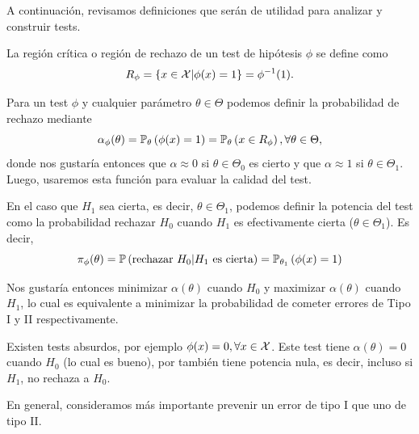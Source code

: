 A continuación, revisamos definiciones que serán de utilidad para analizar y construir tests. 

\begin{definition}
	La región crítica o región de rechazo de un test de hipótesis $\phi$ se define como 
	\begin{equation}
		R_\phi = \{x\in{\mathcal X} | \phi(x)=1\} = \phi^{-1}(1).
	\end{equation}
	
\end{definition}



\begin{definition}
Para un test $\phi$ y cualquier parámetro $\theta\in\Theta$ podemos definir la probabilidad de rechazo mediante
\begin{equation}
 	\alpha_\phi(\theta) = \mathbb{P}_\theta \left(\phi(x)=1\right) = \mathbb{P}_\theta \left(x\in R_\phi\right), \forall\theta\in\Theta,
 \end{equation}
donde nos gustaría entonces que $\alpha\approx 0$ si $\theta\in\Theta_0$ es cierto y que $\alpha\approx 1$ si $\theta\in\Theta_1$. Luego, usaremos esta función para evaluar la calidad del test.
\end{definition}

\begin{definition}
En el caso que $H_1$ sea cierta, es decir, $\theta\in\Theta_1$, podemos definir la potencia del test como la probabilidad rechazar $H_0$ cuando $H_1$ es efectivamente cierta ($\theta\in\Theta_1$). Es decir,
\begin{equation}
 	\pi_\phi(\theta) = \mathbb{P} \left(\text{rechazar } H_0 | H_1 \text{ es cierta}\right)  = \mathbb{P}_{\theta_1} \left(\phi(x)=1\right)
 \end{equation}
 \end{definition}
Nos gustaría entonces minimizar $\alpha(\theta)$ cuando $H_0$ y maximizar $\alpha(\theta)$ cuando $H_1$, lo cual es equivalente a minimizar la probabilidad de cometer errores de Tipo I y II respectivamente. 


\begin{example}
	Existen tests absurdos, por ejemplo $\phi(x) = 0,\forall x\in{\mathcal X}$. Este test tiene $\alpha(\theta)=0$ cuando $H_0$ (lo cual es bueno), por también tiene potencia nula, es decir, incluso si $H_1$, no rechaza a $H_0$. 
 \end{example} 
 En general, consideramos más importante prevenir un error de tipo I que uno de tipo II. 


